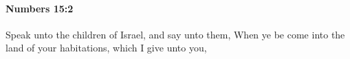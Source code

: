 
		\paragraph{Numbers 15:2} %
			\label{NUMBERS-15-2}

			Speak unto the children of Israel, and say unto them, When ye be come into the land of your habitations, which I give unto you,


